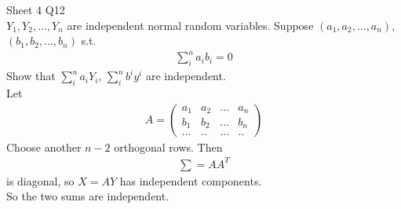\documentclass[a4paper]{article}
\begin{document}
Sheet 4 Q12\\
$Y_1,Y_2,...,Y_n$ are independent normal random variables. Suppose $\left(a_1,a_2,...,a_n\right)$, $\left(b_1,b_2,...,b_n\right)$ s.t.
\begin{equation*}
\begin{aligned}
\sum_i^n a_i b_i = 0
\end{aligned}
\end{equation*}
Show that $\sum_i^n a_i Y_i$, $\sum_i^n b^i y^i$ are independent.\\
Let
\begin{equation*}
\begin{aligned}
A=\left(\begin{matrix}
a_1 &a_2 &... &a_n\\
b_1 &b_2 &... &b_n\\
... &..  &... &..
\end{matrix}\right)
\end{aligned}
\end{equation*}
Choose another $n-2$ orthogonal rows. Then
\begin{equation*}
\begin{aligned}
\sum = AA^T
\end{aligned}
\end{equation*}
is diagonal, so $X=AY$ has independent components.\\
So the two sums are independent.
\end{document}
